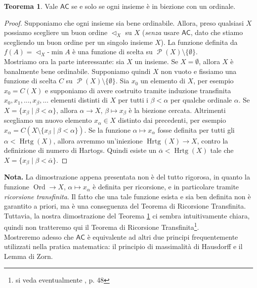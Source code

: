 \documentclass[12pt,a4paper]{report}
\theoremstyle{definition}
\newtheorem{teo}{Teorema}[section]  %
\theoremstyle{num.custom-title}
\DeclareMathOperator{\PP}{\mathcal{P}}
\DeclareMathOperator{\Hrtg}{\text{Hrtg}}
\DeclareMathOperator{\Ord}{\text{Ord}}
\DeclareMathOperator{\sm}{\setminus}
\newcommand{\AC}{\ensuremath{\mathsf{AC}}\xspace}
\begin{document}
\begin{teo}\label{AC-WOT}
Vale \AC se e solo se ogni insieme è in biezione con un ordinale.
\begin{proof}
Supponiamo che ogni insieme sia bene ordinabile. Allora, preso qualsiasi $X$ possiamo scegliere un buon ordine $\vartriangleleft_X$ su $X$ (\emph{senza} usare \AC, dato che stiamo scegliendo un buon ordine per un singolo insieme $X$). La funzione definita da $f(A)=\vartriangleleft_X$-$\min A$ è una funzione di scelta su $\PP (X) \sm \{\emptyset\}$.\\
Mostriamo ora la parte interessante: sia $X$ un insieme. Se $X = \emptyset$, allora $X$ è banalmente bene ordinabile. Supponiamo quindi $X$ non vuoto e fissiamo una funzione di scelta $C$ su $\PP (X) \sm \{\emptyset\}$. Sia $x_0$ un elemento di $X$, per esempio $x_0=C(X)$ e supponiamo di avere costruito tramite induzione transfinita $x_0, x_1, ..., x_\beta, ...$ elementi distinti di $X$ per tutti i $\beta < \alpha$ per qualche ordinale $\alpha$. Se $X=\{x_\beta \mid \beta < \alpha\}$, allora $\alpha \to X$, $\beta \mapsto x_\beta$ è la biezione cercata. Altrimenti scegliamo un nuovo elemento $x_\alpha \in X$ distinto dai precedenti, per esempio $x_\alpha = C(X \sm \{x_\beta \mid \beta < \alpha\})$. Se la funzione $\alpha \mapsto x_\alpha$ fosse definita per tutti gli $\alpha < \Hrtg(X)$, allora avremmo un'iniezione $\Hrtg(X) \to X$, contro la definizione di numero di Hartogs. Quindi esiste un $\overline{\alpha} < \Hrtg(X)$ tale che $X=\{x_\beta \mid \beta < \overline{\alpha}\}$.
\end{proof}
\end{teo}

\noindent\textbf{Nota.} La dimostrazione appena presentata non è del tutto rigorosa, in quanto la funzione $\Ord \to X$, $\alpha \mapsto x_\alpha$ è definita per ricorsione, e in particolare tramite \emph{ricorsione transfinita}. Il fatto che una tale funzione esista e sia ben definita non è garantito a priori, ma è una conseguenza del Teorema di Ricorsione Transfinita. Tuttavia, la nostra dimostrazione del Teorema \ref{AC-WOT} ci sembra intuitivamente chiara, quindi non tratteremo qui il Teorema di Ricorsione Transfinita\footnote{si veda eventualmente \cite{Kunen:logica}, p. 48}.\\

Mostreremo adesso che \AC è equivalente ad altri due principi frequentemente utilizzati nella pratica matematica: il principio di massimalità di Hausdorff e il Lemma di Zorn.
\end{document}
